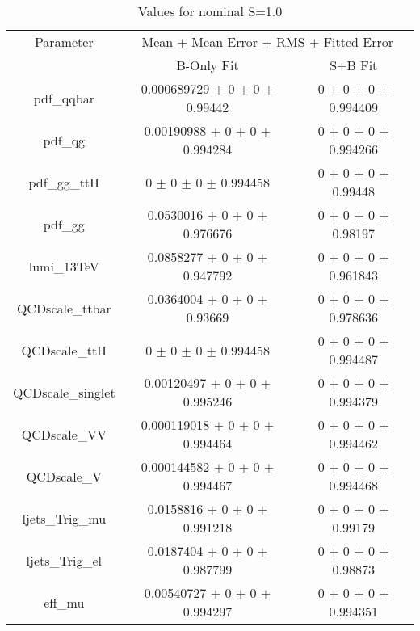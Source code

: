 \begin{table}
\centering
\caption{Values for nominal S=1.0}
\begin{tabular}{ccc}
\toprule
Parameter & \multicolumn{2}{c}{Mean $\pm$ Mean Error $\pm$ RMS $\pm$ Fitted Error}\\
 & B-Only Fit & S+B Fit\\
\midrule
pdf\_qqbar & \num{0.000689729} $\pm$ \num{0} $\pm$ \num{0} $\pm$ \num{0.99442} & \num{0} $\pm$ \num{0} $\pm$ \num{0} $\pm$ \num{0.994409}\\
pdf\_qg & \num{0.00190988} $\pm$ \num{0} $\pm$ \num{0} $\pm$ \num{0.994284} & \num{0} $\pm$ \num{0} $\pm$ \num{0} $\pm$ \num{0.994266}\\
pdf\_gg\_ttH & \num{0} $\pm$ \num{0} $\pm$ \num{0} $\pm$ \num{0.994458} & \num{0} $\pm$ \num{0} $\pm$ \num{0} $\pm$ \num{0.99448}\\
pdf\_gg & \num{0.0530016} $\pm$ \num{0} $\pm$ \num{0} $\pm$ \num{0.976676} & \num{0} $\pm$ \num{0} $\pm$ \num{0} $\pm$ \num{0.98197}\\
lumi\_13TeV & \num{0.0858277} $\pm$ \num{0} $\pm$ \num{0} $\pm$ \num{0.947792} & \num{0} $\pm$ \num{0} $\pm$ \num{0} $\pm$ \num{0.961843}\\
QCDscale\_ttbar & \num{0.0364004} $\pm$ \num{0} $\pm$ \num{0} $\pm$ \num{0.93669} & \num{0} $\pm$ \num{0} $\pm$ \num{0} $\pm$ \num{0.978636}\\
QCDscale\_ttH & \num{0} $\pm$ \num{0} $\pm$ \num{0} $\pm$ \num{0.994458} & \num{0} $\pm$ \num{0} $\pm$ \num{0} $\pm$ \num{0.994487}\\
QCDscale\_singlet & \num{0.00120497} $\pm$ \num{0} $\pm$ \num{0} $\pm$ \num{0.995246} & \num{0} $\pm$ \num{0} $\pm$ \num{0} $\pm$ \num{0.994379}\\
QCDscale\_VV & \num{0.000119018} $\pm$ \num{0} $\pm$ \num{0} $\pm$ \num{0.994464} & \num{0} $\pm$ \num{0} $\pm$ \num{0} $\pm$ \num{0.994462}\\
QCDscale\_V & \num{0.000144582} $\pm$ \num{0} $\pm$ \num{0} $\pm$ \num{0.994467} & \num{0} $\pm$ \num{0} $\pm$ \num{0} $\pm$ \num{0.994468}\\
ljets\_Trig\_mu & \num{0.0158816} $\pm$ \num{0} $\pm$ \num{0} $\pm$ \num{0.991218} & \num{0} $\pm$ \num{0} $\pm$ \num{0} $\pm$ \num{0.99179}\\
ljets\_Trig\_el & \num{0.0187404} $\pm$ \num{0} $\pm$ \num{0} $\pm$ \num{0.987799} & \num{0} $\pm$ \num{0} $\pm$ \num{0} $\pm$ \num{0.98873}\\
eff\_mu & \num{0.00540727} $\pm$ \num{0} $\pm$ \num{0} $\pm$ \num{0.994297} & \num{0} $\pm$ \num{0} $\pm$ \num{0} $\pm$ \num{0.994351}\\

\end{tabular}
\end{table}
